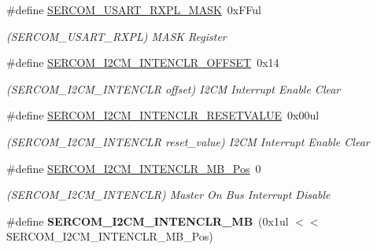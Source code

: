 \begin{DoxyCompactItemize}
\item 
\hypertarget{group___s_a_m_l21___s_e_r_c_o_m_ga76328710609df1bce1ea6c8fd51b683f}{}\#define \hyperlink{group___s_a_m_l21___s_e_r_c_o_m_ga76328710609df1bce1ea6c8fd51b683f}{S\+E\+R\+C\+O\+M\+\_\+\+U\+S\+A\+R\+T\+\_\+\+R\+X\+P\+L\+\_\+\+M\+A\+S\+K}~0x\+F\+Ful\label{group___s_a_m_l21___s_e_r_c_o_m_ga76328710609df1bce1ea6c8fd51b683f}

\begin{DoxyCompactList}\small\item\em (S\+E\+R\+C\+O\+M\+\_\+\+U\+S\+A\+R\+T\+\_\+\+R\+X\+P\+L) M\+A\+S\+K Register \end{DoxyCompactList}\item 
\hypertarget{group___s_a_m_l21___s_e_r_c_o_m_ga2cf91d0a9c9749263ade4e14972a2ff2}{}\#define \hyperlink{group___s_a_m_l21___s_e_r_c_o_m_ga2cf91d0a9c9749263ade4e14972a2ff2}{S\+E\+R\+C\+O\+M\+\_\+\+I2\+C\+M\+\_\+\+I\+N\+T\+E\+N\+C\+L\+R\+\_\+\+O\+F\+F\+S\+E\+T}~0x14\label{group___s_a_m_l21___s_e_r_c_o_m_ga2cf91d0a9c9749263ade4e14972a2ff2}

\begin{DoxyCompactList}\small\item\em (S\+E\+R\+C\+O\+M\+\_\+\+I2\+C\+M\+\_\+\+I\+N\+T\+E\+N\+C\+L\+R offset) I2\+C\+M Interrupt Enable Clear \end{DoxyCompactList}\item 
\hypertarget{group___s_a_m_l21___s_e_r_c_o_m_ga5a587ab0a5dcc7dda7dd17673c17b28c}{}\#define \hyperlink{group___s_a_m_l21___s_e_r_c_o_m_ga5a587ab0a5dcc7dda7dd17673c17b28c}{S\+E\+R\+C\+O\+M\+\_\+\+I2\+C\+M\+\_\+\+I\+N\+T\+E\+N\+C\+L\+R\+\_\+\+R\+E\+S\+E\+T\+V\+A\+L\+U\+E}~0x00ul\label{group___s_a_m_l21___s_e_r_c_o_m_ga5a587ab0a5dcc7dda7dd17673c17b28c}

\begin{DoxyCompactList}\small\item\em (S\+E\+R\+C\+O\+M\+\_\+\+I2\+C\+M\+\_\+\+I\+N\+T\+E\+N\+C\+L\+R reset\+\_\+value) I2\+C\+M Interrupt Enable Clear \end{DoxyCompactList}\item 
\hypertarget{group___s_a_m_l21___s_e_r_c_o_m_ga951469e498b21d0fd15e4e8cd5ef4e7b}{}\#define \hyperlink{group___s_a_m_l21___s_e_r_c_o_m_ga951469e498b21d0fd15e4e8cd5ef4e7b}{S\+E\+R\+C\+O\+M\+\_\+\+I2\+C\+M\+\_\+\+I\+N\+T\+E\+N\+C\+L\+R\+\_\+\+M\+B\+\_\+\+Pos}~0\label{group___s_a_m_l21___s_e_r_c_o_m_ga951469e498b21d0fd15e4e8cd5ef4e7b}

\begin{DoxyCompactList}\small\item\em (S\+E\+R\+C\+O\+M\+\_\+\+I2\+C\+M\+\_\+\+I\+N\+T\+E\+N\+C\+L\+R) Master On Bus Interrupt Disable \end{DoxyCompactList}\item 
\hypertarget{group___s_a_m_l21___s_e_r_c_o_m_ga3d6712b3e502fcf749649e931c0657b8}{}\#define {\bfseries S\+E\+R\+C\+O\+M\+\_\+\+I2\+C\+M\+\_\+\+I\+N\+T\+E\+N\+C\+L\+R\+\_\+\+M\+B}~(0x1ul $<$$<$ S\+E\+R\+C\+O\+M\+\_\+\+I2\+C\+M\+\_\+\+I\+N\+T\+E\+N\+C\+L\+R\+\_\+\+M\+B\+\_\+\+Pos)\label{group___s_a_m_l21___s_e_r_c_o_m_ga3d6712b3e502fcf749649e931c0657b8}


\end{DoxyCompactItemize}
